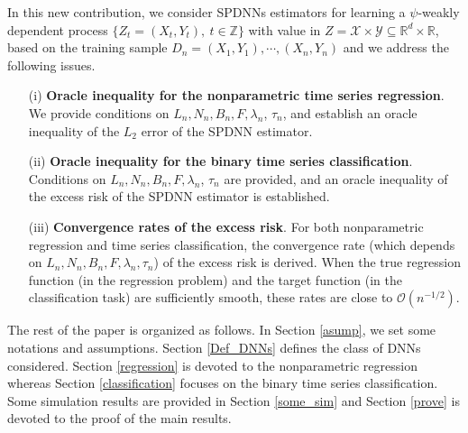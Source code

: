 \documentclass[10pt,twoside]{article}
\numberwithin{equation}{section}
\newcommand{\R}{\ensuremath{\mathbb{R}}}
\newcommand{\Z}{\ensuremath{\mathbb{Z}}}
\begin{document}
\medskip

In this new contribution, we consider SPDNNs estimators for learning a $\psi$-weakly dependent process $ \{Z_t = (X_t, Y_t), ~ t  \in \Z \} $ with value in $ Z= \mathcal{X} \times \mathcal{Y} \subseteq \R^d \times \R $, based on the training sample $D_n = {(X_1, Y_1), \cdots, (X_n, Y_n)} $ and we address the following issues.
%

\begin{itemize}
\item [(i)] \textbf{Oracle inequality for the nonparametric time series regression}. 
 We provide conditions on  $L_n, N_n, B_n, F, \lambda_n$, $\tau_n$, and establish an oracle inequality of the $L_2 $ error of the SPDNN estimator.
%
\item[(ii)] \textbf{Oracle inequality for the binary time series classification}.
Conditions on  $L_n, N_n, B_n, F, \lambda_n$, $\tau_n$ are provided, and an oracle inequality of the excess risk of the SPDNN estimator is established. 
\item[(iii)] \textbf{Convergence rates of the excess risk}. 
  For both nonparametric regression and time series classification, the convergence rate (which depends on $L_n, N_n, B_n, F, \lambda_n, \tau_n$) of the excess risk is derived. When the true regression function (in the regression problem) and the target function (in the classification task) are sufficiently smooth, these rates are close to $\mathcal{O}(n^{-1/2})$.  
\end{itemize}


  
\medskip

%
The rest of the paper is organized as follows. In Section \ref{asump}, we set some  notations and assumptions.  
% 
Section \ref{Def_DNNs} defines the class of DNNs considered.
%
Section \ref{regression} is devoted to the nonparametric regression whereas Section \ref{classification} focuses on the binary time series classification. 
%
Some simulation results are provided in Section \ref{some_sim} and  Section \ref{prove} is devoted to the proof of the main results.




\medskip
\end{document}
